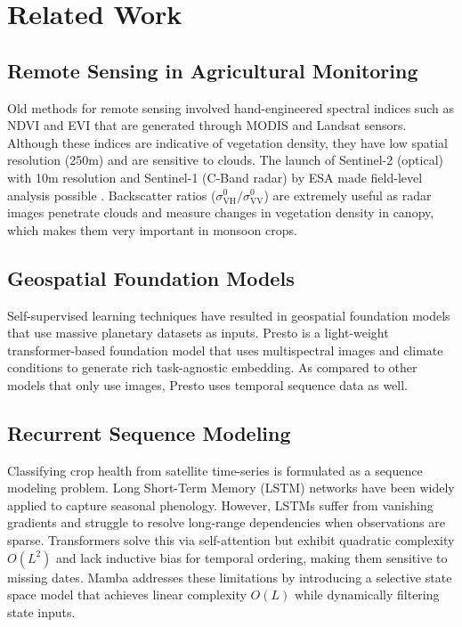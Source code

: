 \documentclass[conference]{IEEEtran}
\begin{document}
\section{Related Work}

\subsection{Remote Sensing in Agricultural Monitoring}
Old methods for remote sensing involved hand-engineered spectral indices such as NDVI and EVI that are generated through MODIS and Landsat sensors. Although these indices are indicative of vegetation density, they have low spatial resolution (250m) and are sensitive to clouds. The launch of Sentinel-2 (optical) with 10m resolution and Sentinel-1 (C-Band radar) by ESA made field-level analysis possible \cite{b6}. Backscatter ratios ($\sigma^0_{\text{VH}} / \sigma^0_{\text{VV}}$) are extremely useful as radar images penetrate clouds and measure changes in vegetation density in canopy, which makes them very important in monsoon crops.
\subsection{Geospatial Foundation Models}
Self-supervised learning techniques have resulted in geospatial foundation models that use massive planetary datasets as inputs. Presto \cite{b2} is a light-weight transformer-based foundation model that uses multispectral images and climate conditions to generate rich task-agnostic embedding. As compared to other models that only use images, Presto uses temporal sequence data as well.

\subsection{Recurrent Sequence Modeling}
Classifying crop health from satellite time-series is formulated as a sequence modeling problem. Long Short-Term Memory (LSTM) networks have been widely applied to capture seasonal phenology. However, LSTMs suffer from vanishing gradients and struggle to resolve long-range dependencies when observations are sparse. Transformers solve this via self-attention but exhibit quadratic complexity $O(L^2)$ and lack inductive bias for temporal ordering, making them sensitive to missing dates. Mamba \cite{b3} addresses these limitations by introducing a selective state space model that achieves linear complexity $O(L)$ while dynamically filtering state inputs.
\end{document}
